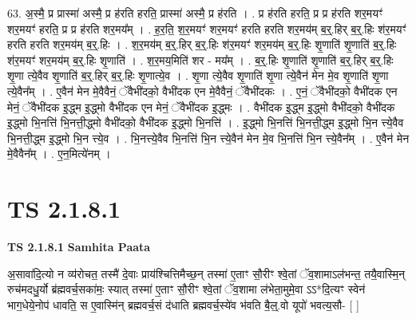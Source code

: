 \documentclass[17pt]{extarticle}
\begin{document}
63. अ॒स्मै॒ प्र प्रास्मा॑ अस्मै॒ प्र ह॑रति हरति॒ प्रास्मा॑ अस्मै॒ प्र ह॑रति । . प्र ह॑रति हरति॒ प्र प्र ह॑रति शर॒मयꣳ॑ शर॒मयꣳ॑ हरति॒ प्र प्र ह॑रति शर॒मय᳚म् । . ह॒र॒ति॒ श॒र॒मयꣳ॑ शर॒मयꣳ॑ हरति हरति शर॒मय॑म् ब॒र्॒.हिर् ब॒र्॒.हिः श॑र॒मयꣳ॑ हरति हरति शर॒मय॑म् ब॒र्॒.हिः । . श॒र॒मय॑म् ब॒र्॒.हिर् ब॒र्॒.हिः श॑र॒मयꣳ॑ शर॒मय॑म् ब॒र्॒.हिः शृ॒णाति॑ शृ॒णाति॑ ब॒र्॒.हिः श॑र॒मयꣳ॑ शर॒मय॑म् ब॒र्॒.हिः शृ॒णाति॑ । . श॒र॒मय॒मिति॑ शर - मय᳚म् । . ब॒र्॒.हिः शृ॒णाति॑ शृ॒णाति॑ ब॒र्॒.हिर् ब॒र्॒.हिः शृ॒णा त्ये॒वैव शृ॒णाति॑ ब॒र्॒.हिर् ब॒र्॒.हिः शृ॒णात्ये॒व । . शृ॒णा त्ये॒वैव शृ॒णाति॑ शृ॒णा त्ये॒वैन॑ मेन मे॒व शृ॒णाति॑ शृ॒णा त्ये॒वैन᳚म् । . ए॒वैन॑ मेन मे॒वैवैनं॒ ॅवैभी॑दको॒ वैभी॑दक एन मे॒वैवैनं॒ ॅवैभी॑दकः । . ए॒नं॒ ॅवैभी॑दको॒ वैभी॑दक एन मेनं॒ ॅवैभी॑दक इ॒द्ध्म इ॒द्ध्मो वैभी॑दक एन मेनं॒ ॅवैभी॑दक इ॒द्ध्मः । . वैभी॑दक इ॒द्ध्म इ॒द्ध्मो वैभी॑दको॒ वैभी॑दक इ॒द्ध्मो भि॒नत्ति॑ भि॒नत्ती॒द्ध्मो वैभी॑दको॒ वैभी॑दक इ॒द्ध्मो भि॒नत्ति॑ । . इ॒द्ध्मो भि॒नत्ति॑ भि॒नत्ती॒द्ध्म इ॒द्ध्मो भि॒न त्त्ये॒वैव भि॒नत्ती॒द्ध्म इ॒द्ध्मो भि॒न त्त्ये॒व । . भि॒नत्त्ये॒वैव भि॒नत्ति॑ भि॒न त्त्ये॒वैन॑ मेन मे॒व भि॒नत्ति॑ भि॒न त्त्ये॒वैन᳚म् । . ए॒वैन॑ मेन मे॒वैवैन᳚म् । . ए॒न॒मित्ये॑नम् । \newline
\pagebreak
{}

\section{ TS 2.1.8.1 }

\textbf{TS 2.1.8.1 } \newline
\textbf{Samhita Paata} \newline

अ॒सावा॑दि॒त्यो न व्य॑रोचत॒ तस्मै॑ दे॒वाः प्राय॑श्चित्तिमैच्छ॒न् तस्मा॑ ए॒ताꣳ सौ॒रीꣳ श्वे॒तां ॅव॒शामाऽल॑भन्त॒ तयै॒वास्मि॒न् रुच॑मदधु॒र्यो ब्र॑ह्मवर्च॒सका॑मः॒ स्यात् तस्मा॑ ए॒ताꣳ सौ॒रीꣳ श्वे॒तां ॅव॒शामा ल॑भेता॒मुमे॒वा ऽऽ*दि॒त्यꣳ स्वेन॑ भाग॒धेये॒नोप॑ धावति॒ स ए॒वास्मि॑न् ब्रह्मवर्च॒सं द॑धाति ब्रह्मवर्च॒स्ये॑व भ॑वति बै॒ल्॒.वो यूपो॑ भवत्य॒सौ-  [  ] \newline
\end{document}

